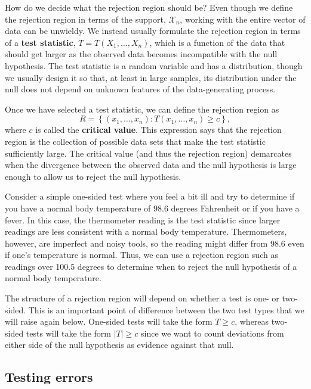 \documentclass[
  13pt,
  letterpaper,
  DIV=11,
  numbers=noendperiod]{scrreprt}
\theoremstyle{plain}
\theoremstyle{plain}
\theoremstyle{definition}
\theoremstyle{definition}
\theoremstyle{remark}
\begin{document}
How do we decide what the rejection region should be? Even though we
define the rejection region in terms of the support, \(\mathcal{X}_n\),
working with the entire vector of data can be unwieldy. We instead
usually formulate the rejection region in terms of a \textbf{test
statistic}, \(T = T(X_1, \ldots, X_n)\), which is a function of the data
that should get larger as the observed data becomes incompatible with
the null hypothesis. The test statistic is a random variable and has a
distribution, though we usually design it so that, at least in large
samples, its distribution under the null does not depend on unknown
features of the data-generating process.

Once we have selected a test statistic, we can define the rejection
region as \[
R = \left\{(x_1, \ldots, x_n) : T(x_1, \ldots, x_n) \geq c\right\},
\] where \(c\) is called the \textbf{critical value}. This expression
says that the rejection region is the collection of possible data sets
that make the test statistic sufficiently large. The critical value (and
thus the rejection region) demarcates when the divergence between the
observed data and the null hypothesis is large enough to allow us to
reject the null hypothesis.

Consider a simple one-sided test where you feel a bit ill and try to
determine if you have a normal body temperature of 98.6 degrees
Fahrenheit or if you have a fever. In this case, the thermometer reading
is the test statistic since larger readings are less consistent with a
normal body temperature. Thermometers, however, are imperfect and noisy
tools, so the reading might differ from 98.6 even if one's temperature
is normal. Thus, we can use a rejection region such as readings over
100.5 degrees to determine when to reject the null hypothesis of a
normal body temperature.

The structure of a rejection region will depend on whether a test is
one- or two-sided. This is an important point of difference between the
two test types that we will raise again below. One-sided tests will take
the form \(T \geq c\), whereas two-sided tests will take the form
\(|T| \geq c\) since we want to count deviations from either side of the
null hypothesis as evidence against that null.

\subsection{Testing errors}\label{sec-testing-errors}
\end{document}
